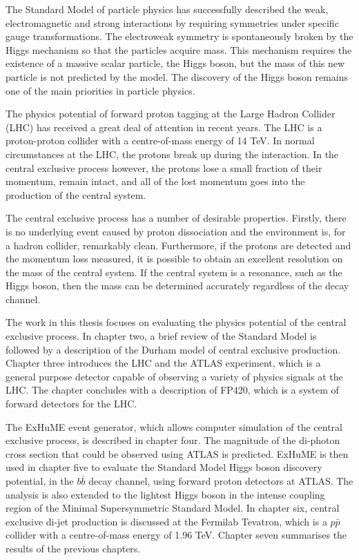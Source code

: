 The Standard Model of particle physics has successfully described the weak, electromagnetic and strong interactions by requiring symmetries under specific gauge transformations. The electroweak symmetry is spontaneously broken by the Higgs mechanism so that the particles acquire mass. This mechanism requires the existence of a massive scalar particle, the Higgs boson, but the mass of this new particle is not predicted by the model. The discovery of the Higgs boson remains one of the main priorities in particle physics. 

The physics potential of forward proton tagging at the Large Hadron Collider  (LHC) 
has received a great deal of attention in recent years. 
The LHC is a proton-proton collider with a centre-of-mass energy of 14 TeV.
In normal circumstances at the LHC, the protons break up during the interaction.  
In the central exclusive process however, the protons lose a small fraction of their momentum, remain intact, and all of the lost momentum goes into the production of the central system. 

The central exclusive process has a number of desirable properties. Firstly, there is no underlying event caused by proton dissociation and the environment is, for a hadron collider, remarkably clean. Furthermore, if the protons are detected and the momentum loss measured, it is possible to obtain an excellent resolution on the mass of the central system. If the central system is a resonance, such as the Higgs boson, then the mass can be determined accurately regardless of the decay channel. 

The work in this thesis focuses on evaluating the physics potential of the central exclusive process. In chapter two, a brief review of the Standard Model is followed by a description of the Durham model of central exclusive production. Chapter three introduces the LHC and the ATLAS experiment, which is a general purpose detector capable of observing a variety of physics signals at the LHC. The chapter concludes with a description of FP420, which is a system of forward detectors for the LHC.

The ExHuME event generator, which allows computer simulation of the central exclusive process, is described in chapter four. The magnitude of the di-photon cross section that could be observed using ATLAS is predicted. ExHuME is then used in chapter five to evaluate the Standard Model Higgs boson discovery potential, in the $b \bar{b}$ decay channel, using forward proton detectors at ATLAS. The analysis is also extended to the lightest Higgs boson in the intense coupling region of the Minimal Supersymmetric Standard Model. In chapter six, central exclusive di-jet production is discussed at the Fermilab Tevatron, which is a $p \bar{p}$ collider with a centre-of-mass energy of 1.96 TeV. Chapter seven summarises the results of the previous chapters.
